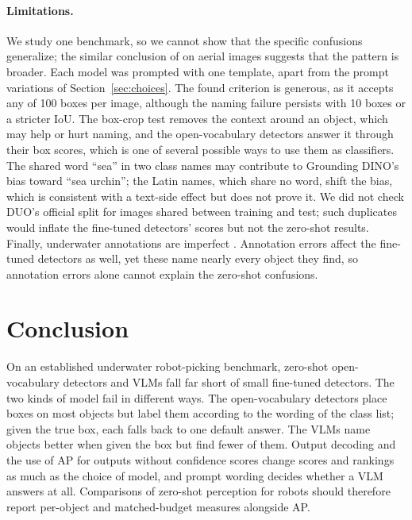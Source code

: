 \documentclass[letterpaper]{article} %
\begin{document}
\paragraph{Limitations.}
We study one benchmark, so we cannot show that the specific confusions generalize; the similar conclusion of \citet{tsourveloudis2026aerial} on aerial images suggests that the pattern is broader. Each model was prompted with one template, apart from the prompt variations of Section~\ref{sec:choices}. The found criterion is generous, as it accepts any of 100 boxes per image, although the naming failure persists with 10 boxes or a stricter IoU. The box-crop test removes the context around an object, which may help or hurt naming, and the open-vocabulary detectors answer it through their box scores, which is one of several possible ways to use them as classifiers. The shared word ``sea'' in two class names may contribute to Grounding DINO's bias toward ``sea urchin''; the Latin names, which share no word, shift the bias, which is consistent with a text-side effect but does not prove it. We did not check DUO's official split for images shared between training and test; such duplicates would inflate the fine-tuned detectors' scores but not the zero-shot results. Finally, underwater annotations are imperfect \citep{wille2026domain}. Annotation errors affect the fine-tuned detectors as well, yet these name nearly every object they find, so annotation errors alone cannot explain the zero-shot confusions.

\section{Conclusion}

On an established underwater robot-picking benchmark, zero-shot open-vocabulary detectors and VLMs fall far short of small fine-tuned detectors. The two kinds of model fail in different ways. The open-vocabulary detectors place boxes on most objects but label them according to the wording of the class list; given the true box, each falls back to one default answer. The VLMs name objects better when given the box but find fewer of them. Output decoding and the use of AP for outputs without confidence scores change scores and rankings as much as the choice of model, and prompt wording decides whether a VLM answers at all. Comparisons of zero-shot perception for robots should therefore report per-object and matched-budget measures alongside AP.


\end{document}
